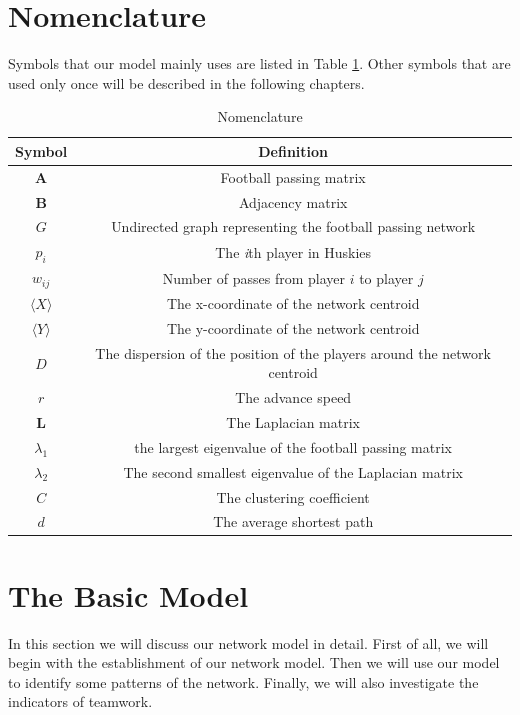\documentclass{mcmthesis}
\begin{document}
\section{Nomenclature}
	Symbols that our model mainly uses are listed in Table \ref{tab:Nomen}.  Other symbols that are used only once will be described in the following chapters.
	\begin{table}
    	\centering
    	\caption{Nomenclature}
		\label{tab:Nomen}
		\begin{tabular}{c c}
			\hline	
				Symbol & Definition\\
			\hline
				$\textbf{A}$ & Football passing matrix\\
				$\textbf{B}$ & Adjacency matrix\\
				$G$ & Undirected graph representing the football passing network\\
				$p_{i}$ & The \emph{i}th player in Huskies\\
				$w_{ij}$ & Number of passes from player $i$ to player $j$\\
				$\langle$$X$$\rangle$ & The x-coordinate of the network centroid\\
				$\langle$$Y$$\rangle$ & The y-coordinate of the network centroid\\
				$D$ & The dispersion of the position of the players around the network centroid\\
				$r$ & The advance speed\\
				$\textbf{L}$ & The Laplacian matrix\\
				$\lambda_{1}$ & the largest eigenvalue of the football passing matrix\\
				$\lambda_{2}$ & The second smallest eigenvalue of the Laplacian matrix\\
				$C$ & The clustering coefficient\\
				$d$ & The average shortest path\\
			\hline
   	 	\end{tabular}
	\end{table}

\section{The Basic Model}
	In this section we will discuss our network model in detail.  First of all, we will begin with the establishment of our network model.  Then we will use our model to identify some patterns of the network.  Finally, we will also investigate the indicators of teamwork. 
\end{document}

